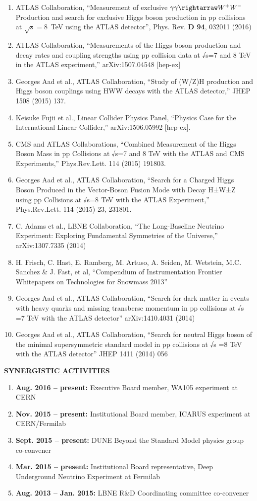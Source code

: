 \begin{enumerate}[noitemsep]
\item ATLAS Collaboration, “Measurement of exclusive $\gamma\gamma\rightarraw W^{+}W^{-}$ Production and search for exclusive Higgs boson production in pp collisions at $\sqrt{s}=8$~TeV using the ATLAS detector”, Phys. Rev. {\bf D 94}, 032011 (2016)
\item ATLAS Collaboration, “Measurements of the Higgs boson production and decay rates and coupling strengths using pp collision data at √s=7 and 8 TeV in the ATLAS experiment,” arXiv:1507.04548 [hep-ex]
\item Georges Aad et al., ATLAS Collaboration, “Study of (W/Z)H production and Higgs boson couplings using HWW decays with the ATLAS detector,” JHEP 1508 (2015) 137.
\item Keisuke Fujii et al., Linear Collider Physics Panel, “Physics Case for the International Linear Collider,” arXiv:1506.05992 [hep-ex].
\item CMS and ATLAS Collaborations, “Combined Measurement of the Higgs Boson Mass in pp Collisions at √s=7 and 8 TeV with the ATLAS and CMS Experiments,” Phys.Rev.Lett. 114 (2015) 191803.
\item Georges Aad et al., ATLAS Collaboration, “Search for a Charged Higgs Boson Produced in the Vector-Boson Fusion Mode with Decay H±W±Z using pp Collisions at √s=8  TeV with the ATLAS Experiment,” Phys.Rev.Lett. 114 (2015) 23, 231801.
\item C. Adams et al., LBNE Collaboration, “The Long-Baseline Neutrino Experiment: Exploring Fundamental Symmetries of the Universe,” arXiv:1307.7335 (2014)
\item H. Frisch, C. Hast, E. Ramberg, M. Artuso, A. Seiden, M. Wetstein, M.C. Sanchez \& J. Fast, et al, “Compendium of Instrumentation Frontier Whitepapers on Technologies for Snowmass 2013” 
\item Georges Aad et al., ATLAS Collaboration, “Search for dark matter in events with heavy quarks and missing transberse momentum in pp collisions at √s =7 TeV with the ATLAS detector” arXiv:1410.4031 (2014)
\item Georges Aad et al., ATLAS Collaboration, “Search for neutral Higgs boson of the minimal supersymmetric standard model in pp collisions at √s =8 TeV with the ATLAS detector” JHEP 1411 (2014) 056
\end{enumerate}
%
{\underline{\underline{{\bf SYNERGISTIC ACTIVITIES}}}}
\begin{enumerate}[noitemsep]
\item {\bf Aug. 2016 – present:} Executive Board member, WA105 experiment at CERN
\item {\bf Nov. 2015 – present:} Institutional Board member, ICARUS experiment at CERN/Fermilab
\item {\bf Sept. 2015 – present:} DUNE Beyond the Standard Model physics group co-convener
\item {\bf Mar. 2015 – present:} Institutional Board representative, Deep Underground Neutrino Experiment at Fermilab
\item {\bf Aug. 2013 – Jan. 2015:} LBNE R\&D Coordinating committee co-convener
\end{enumerate}
